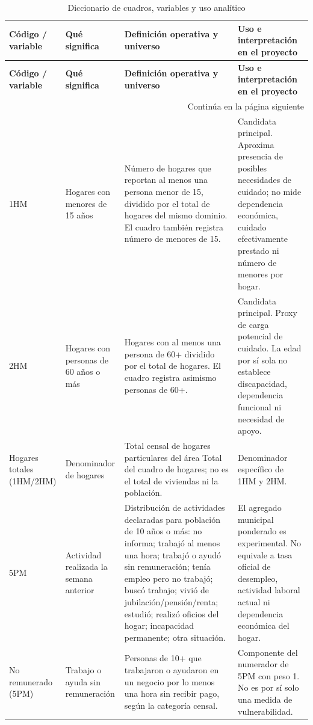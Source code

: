 \begin{singlespace}
\small
\begin{longtable}{@{}p{}p{}p{}p{}@{}}
\caption{Diccionario de cuadros, variables y uso analítico}\label{tab:diccionario_operativo}\\
\toprule
\textbf{Código / variable} & \textbf{Qué significa} & \textbf{Definición operativa y universo} & \textbf{Uso e interpretación en el proyecto}\\
\midrule
\endfirsthead
\toprule
\textbf{Código / variable} & \textbf{Qué significa} & \textbf{Definición operativa y universo} & \textbf{Uso e interpretación en el proyecto}\\
\midrule
\endhead
\midrule
\multicolumn{4}{r}{Continúa en la página siguiente}\\
\endfoot
\bottomrule
\endlastfoot
1HM & Hogares con menores de 15 años & Número de hogares que reportan al menos una persona menor de 15, dividido por el total de hogares del mismo dominio. El cuadro también registra número de menores de 15. & Candidata principal. Aproxima presencia de posibles necesidades de cuidado; no mide dependencia económica, cuidado efectivamente prestado ni número de menores por hogar.\\
2HM & Hogares con personas de 60 años o más & Hogares con al menos una persona de 60+ dividido por el total de hogares. El cuadro registra asimismo personas de 60+. & Candidata principal. Proxy de carga potencial de cuidado. La edad por sí sola no establece discapacidad, dependencia funcional ni necesidad de apoyo.\\
Hogares totales (1HM/2HM) & Denominador de hogares & Total censal de hogares particulares del área Total del cuadro de hogares; no es el total de viviendas ni la población. & Denominador específico de 1HM y 2HM.\\
5PM & Actividad realizada la semana anterior & Distribución de actividades declaradas para población de 10 años o más: no informa; trabajó al menos una hora; trabajó o ayudó sin remuneración; tenía empleo pero no trabajó; buscó trabajo; vivió de jubilación/pensión/renta; estudió; realizó oficios del hogar; incapacidad permanente; otra situación. & El agregado municipal ponderado es experimental. No equivale a tasa oficial de desempleo, actividad laboral actual ni dependencia económica del hogar.\\
No remunerado (5PM) & Trabajo o ayuda sin remuneración & Personas de 10+ que trabajaron o ayudaron en un negocio por lo menos una hora sin recibir pago, según la categoría censal. & Componente del numerador de 5PM con peso 1. No es por sí solo una medida de vulnerabilidad.\\

\end{longtable}
\end{singlespace}
